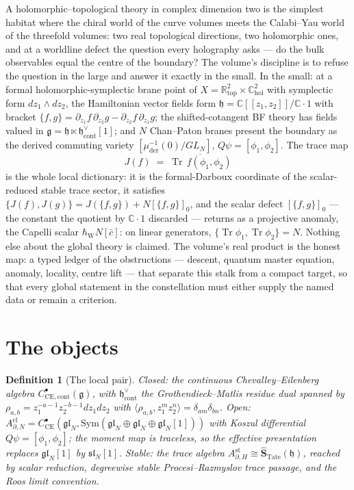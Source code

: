 \documentclass[11pt]{article}
\providecommand{\bC}{\mathbb{C}}
\providecommand{\bR}{\mathbb{R}}
\providecommand{\fg}{\mathfrak{g}}
\providecommand{\fh}{\mathfrak{h}}
\providecommand{\fgl}{\mathfrak{gl}}
\providecommand{\fsl}{\mathfrak{sl}}
\providecommand{\Tr}{\operatorname{Tr}}
\providecommand{\CE}{\mathrm{CE}}
\providecommand{\hbW}{\hbar_{\mathrm{W}}}
\newtheorem{definition}[theorem]{Definition}
\begin{document}
A holomorphic--topological theory in complex dimension two is the
simplest habitat where the chiral world of the curve volumes meets the
Calabi--Yau world of the threefold volumes: two real topological
directions, two holomorphic ones, and at a worldline defect the
question every holography asks --- do the bulk observables equal the
centre of the boundary? The volume's discipline is to refuse the
question in the large and answer it exactly in the small. In the
small: at a formal holomorphic-symplectic brane point of
$X=\bR^2_{\mathrm{top}}\times\bC^2_{\mathrm{hol}}$ with symplectic
form $dz_1\wedge dz_2$, the Hamiltonian vector fields form
$\fh=\bC[[z_1,z_2]]/\bC\cdot1$ with bracket
$\{f,g\}=\partial_{z_1}f\,\partial_{z_2}g
-\partial_{z_2}f\,\partial_{z_1}g$; the shifted-cotangent BF theory
has fields valued in $\fg=\fh\ltimes\fh^\vee_{\mathrm{cont}}[1]$; and
$N$ Chan--Paton branes present the boundary as the derived commuting
variety $[\mu^{-1}_{\mathrm{der}}(0)/GL_N]$, $Q\psi=[\phi_1,\phi_2]$.
The trace map
\[
J(f)\;=\;\overline{\Tr\,f(\phi_1,\phi_2)}
\]
is the whole local dictionary: it is the formal-Darboux coordinate of
the scalar-reduced stable trace sector, it satisfies
$\{J(f),J(g)\}=J(\{f,g\})+N[\{f,g\}]_0$, and the scalar defect
$[\{f,g\}]_0$ --- the constant the quotient by $\bC\cdot1$ discarded
--- returns as a projective anomaly, the Capelli scalar
$\hbW N[\bar c]$: on linear generators,
$\{\Tr\phi_1,\Tr\phi_2\}=N$. Nothing else about the global theory is
claimed. The volume's real product is the honest map: a typed ledger
of the obstructions --- descent, quantum master equation, anomaly,
locality, centre lift --- that separate this stalk from a compact
target, so that every global statement in the constellation must
either supply the named data or remain a criterion.

\section{The objects}\label{sec:objects}

\begin{definition}[The local pair]
Closed: the continuous Chevalley--Eilenberg algebra
$C^\bullet_{\CE,\mathrm{cont}}(\fg)$, with
$\fh^\vee_{\mathrm{cont}}$ the Grothendieck--Matlis residue dual
spanned by $\rho_{a,b}=z_1^{-a-1}z_2^{-b-1}dz_1dz_2$ with
$\langle\rho_{a,b},z_1^mz_2^n\rangle=\delta_{am}\delta_{bn}$. Open:
$A^{\mathrm{cl}}_{\partial,N}
=C^\bullet_{\CE}(\fgl_N,\mathrm{Sym}(\fgl_N\oplus\fgl_N
\oplus\fgl_N[1]))$ with Koszul differential $Q\psi=[\phi_1,\phi_2]$;
the moment map is traceless, so the effective presentation replaces
$\fgl_N[1]$ by $\fsl_N[1]$. Stable: the trace algebra
$A^{\mathrm{st}}_{\partial,H}\cong
\widehat{\mathbf S}_{\mathrm{Tate}}(\fh)$, reached by scalar
reduction, degreewise stable Procesi--Razmyslov trace passage, and the
Roos limit convention.
\end{definition}
\end{document}
